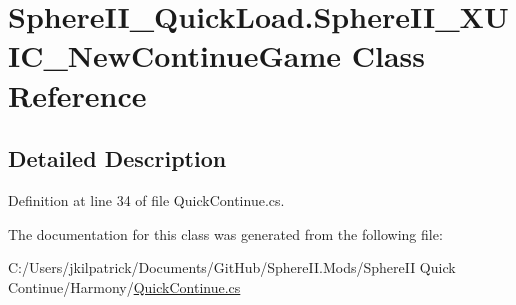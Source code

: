 \hypertarget{class_sphere_i_i___quick_load_1_1_sphere_i_i___x_u_i_c___new_continue_game}{}\section{Sphere\+I\+I\+\_\+\+Quick\+Load.\+Sphere\+I\+I\+\_\+\+X\+U\+I\+C\+\_\+\+New\+Continue\+Game Class Reference}
\label{class_sphere_i_i___quick_load_1_1_sphere_i_i___x_u_i_c___new_continue_game}


\subsection{Detailed Description}


Definition at line 34 of file Quick\+Continue.\+cs.



The documentation for this class was generated from the following file\+:\begin{DoxyCompactItemize}
\item 
C\+:/\+Users/jkilpatrick/\+Documents/\+Git\+Hub/\+Sphere\+I\+I.\+Mods/\+Sphere\+I\+I Quick Continue/\+Harmony/\mbox{\hyperlink{_sphere_i_i_01_quick_01_continue_2_harmony_2_quick_continue_8cs}{Quick\+Continue.\+cs}}\end{DoxyCompactItemize}
